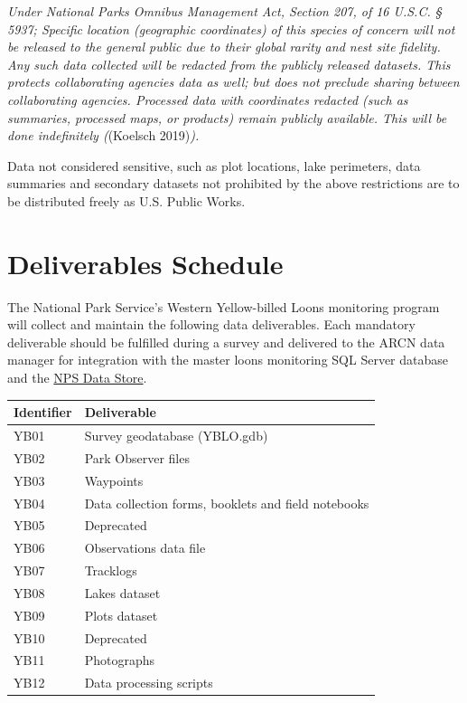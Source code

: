 \documentclass[
  letterpaper,
  DIV=11,
  numbers=noendperiod]{scrreprt}
\begin{document}
\emph{Under National Parks Omnibus Management Act, Section 207, of 16
U.S.C. § 5937; Specific location (geographic coordinates) of this
species of concern will not be released to the general public due to
their global rarity and nest site fidelity. Any such data collected will
be redacted from the publicly released datasets. This protects
collaborating agencies data as well; but does not preclude sharing
between collaborating agencies. Processed data with coordinates redacted
(such as summaries, processed maps, or products) remain publicly
available. This will be done indefinitely (}(Koelsch 2019)\emph{).}

Data not considered sensitive, such as plot locations, lake perimeters,
data summaries and secondary datasets not prohibited by the above
restrictions are to be distributed freely as U.S. Public Works.


\chapter*{Deliverables Schedule}\label{deliverables-schedule}


The National Park Service's Western Yellow-billed Loons monitoring
program will collect and maintain the following data deliverables. Each
mandatory deliverable should be fulfilled during a survey and delivered
to the ARCN data manager for integration with the master loons
monitoring SQL Server database and the
\href{https://irma.nps.gov/DataStore/Reference/Profile/2216938}{NPS Data
Store}.

\begin{longtable}[]{@{}ll@{}}
\toprule\noalign{}
Identifier & Deliverable \\
\midrule\noalign{}
\endhead
\bottomrule\noalign{}
\endlastfoot
YB01 & Survey geodatabase (YBLO.gdb) \\
YB02 & Park Observer files \\
YB03 & Waypoints \\
YB04 & Data collection forms, booklets and field notebooks \\
YB05 & Deprecated \\
YB06 & Observations data file \\
YB07 & Tracklogs \\
YB08 & Lakes dataset \\
YB09 & Plots dataset \\
YB10 & Deprecated \\
YB11 & Photographs \\
YB12 & Data processing scripts \\
\end{longtable}
\end{document}
